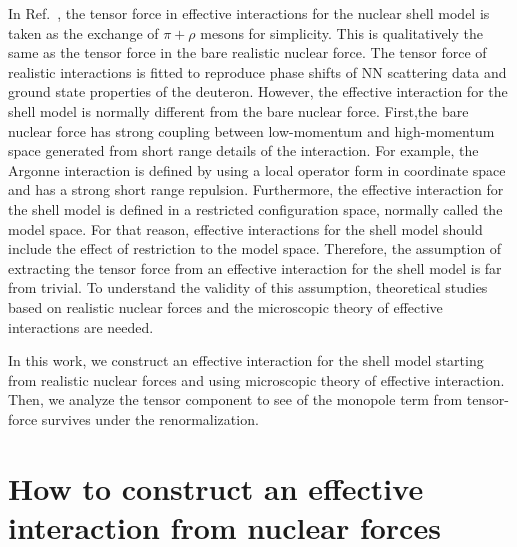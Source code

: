 \documentclass[a4paper]{jpconf}
\begin{document}
  In Ref.~\cite{PhysRevLett.95.232502}, the tensor force in effective interactions for the nuclear shell model
  is taken as the exchange of $\pi+\rho$ mesons for simplicity. This is qualitatively the
  same as the tensor force in the bare realistic nuclear force. The tensor force of realistic interactions is fitted to
  reproduce  phase shifts of NN scattering data and ground state properties of the deuteron.
  However, the effective interaction for the shell model is normally different
  from the bare nuclear force.
  First,the  bare nuclear force has strong coupling between low-momentum and
  high-momentum space generated from short range details of the interaction.
  For example, the Argonne interaction is defined by using a local operator
  form in coordinate space and has a strong short range repulsion.
  Furthermore, the effective interaction for the shell model is defined in
  a restricted configuration space, normally called the model space.
  For that reason, effective interactions for the shell model should include
  the effect of restriction to the model space.
  Therefore, the assumption of extracting the tensor force from an effective
  interaction for the shell model is far from trivial.
  To understand the  validity of this assumption, theoretical studies based on
  realistic nuclear forces and the microscopic
  theory of effective interactions are needed.
  
  In this work, we construct an effective interaction for the shell model
  starting from realistic nuclear forces and using microscopic theory of
  effective interaction. Then, we analyze the tensor component to see of the 
  monopole term from tensor-force survives under the renormalization.
  
 \section{How to construct an effective interaction from nuclear
 forces~\cite{HjorthJensen1995125}} 
 \label{sec:effective}
\end{document}
